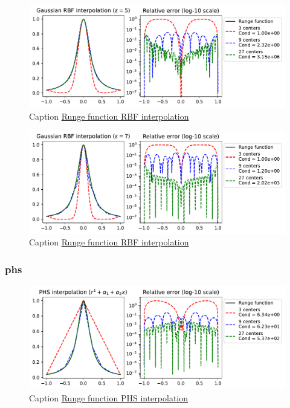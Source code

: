 \documentclass[12pt]{report} %
\begin{document}
\begin{figure}[ht]
    \centering
    \includegraphics[width=\textwidth]{imagenes/rbf_interpolation/rbf_runge_5.pdf}
    \caption{Caption \href{https://github.com/heqro/tfm-experiments/blob/main/introductory_notebooks/rbf_interpolation/runge_phs.ipynb}{Runge function RBF interpolation}}
    \label{fig:rbf-runge-phenomenon-eps-5}
\end{figure}

\begin{figure}[ht]
    \centering
    \includegraphics[width=\textwidth]{imagenes/rbf_interpolation/rbf_runge_7.pdf}
    \caption{Caption \href{https://github.com/heqro/tfm-experiments/blob/main/introductory_notebooks/rbf_interpolation/runge_phs.ipynb}{Runge function RBF interpolation}}
    \label{fig:rbf-runge-phenomenon-eps-7}
\end{figure}

\subsubsection{phs}

\begin{figure}[ht]
    \centering
    \includegraphics[width=\textwidth]{imagenes/phs_interpolation/runge_phs_r1_deg1.pdf}
    \caption{Caption \href{https://github.com/heqro/tfm-experiments/blob/main/introductory_notebooks/rbf_interpolation/runge_phs.ipynb}{Runge function PHS interpolation}}
    \label{fig:phs-runge-phenomenon-deg-1}
\end{figure}
\end{document}
